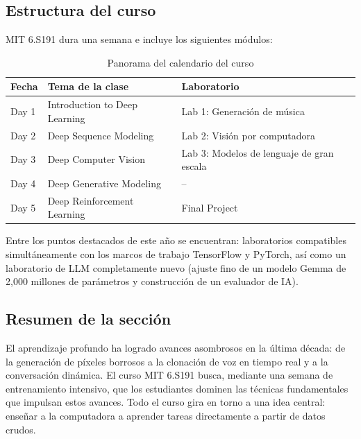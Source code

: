 \subsection{Estructura del curso}

MIT 6.S191 dura una semana e incluye los siguientes módulos:

\begin{table}[H]
\centering
\begin{tabular}{lll}
\toprule
\textbf{Fecha} & \textbf{Tema de la clase} & \textbf{Laboratorio} \\
\midrule
Day 1 & Introduction to Deep Learning & Lab 1: Generación de música \\
Day 2 & Deep Sequence Modeling & Lab 2: Visión por computadora \\
Day 3 & Deep Computer Vision & Lab 3: Modelos de lenguaje de gran escala \\
Day 4 & Deep Generative Modeling & -- \\
Day 5 & Deep Reinforcement Learning & Final Project \\
\bottomrule
\end{tabular}
\caption{Panorama del calendario del curso}
\end{table}

Entre los puntos destacados de este año se encuentran: laboratorios compatibles simultáneamente con los marcos de trabajo TensorFlow y PyTorch, así como un laboratorio de LLM completamente nuevo (ajuste fino de un modelo Gemma de 2,000 millones de parámetros y construcción de un evaluador de IA).

\subsection{Resumen de la sección}

El aprendizaje profundo ha logrado avances asombrosos en la última década: de la generación de píxeles borrosos a la clonación de voz en tiempo real y a la conversación dinámica. El curso MIT 6.S191 busca, mediante una semana de entrenamiento intensivo, que los estudiantes dominen las técnicas fundamentales que impulsan estos avances. Todo el curso gira en torno a una idea central: enseñar a la computadora a aprender tareas directamente a partir de datos crudos.
